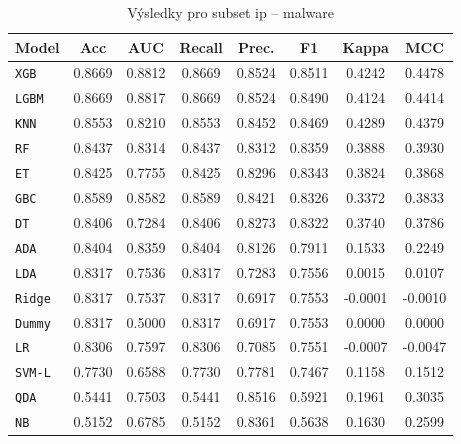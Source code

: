 \begin{table}[H]
  \centering
  \small
  \caption{Výsledky pro subset ip – malware}
  \begin{tabular}{|l|c|c|c|c|c|c|c|}
    \hline
    \textbf{Model} & \textbf{Acc} & \textbf{AUC} & \textbf{Recall} & \textbf{Prec.} & \textbf{F1} & \textbf{Kappa} & \textbf{MCC} \\
    \hline
    \texttt{XGB} & 0.8669 & 0.8812 & 0.8669 & 0.8524 & 0.8511 & 0.4242 & 0.4478 \\
    \texttt{LGBM} & 0.8669 & 0.8817 & 0.8669 & 0.8524 & 0.8490 & 0.4124 & 0.4414 \\
    \texttt{KNN} & 0.8553 & 0.8210 & 0.8553 & 0.8452 & 0.8469 & 0.4289 & 0.4379 \\
    \texttt{RF} & 0.8437 & 0.8314 & 0.8437 & 0.8312 & 0.8359 & 0.3888 & 0.3930 \\
    \texttt{ET} & 0.8425 & 0.7755 & 0.8425 & 0.8296 & 0.8343 & 0.3824 & 0.3868 \\
    \texttt{GBC} & 0.8589 & 0.8582 & 0.8589 & 0.8421 & 0.8326 & 0.3372 & 0.3833 \\
    \texttt{DT} & 0.8406 & 0.7284 & 0.8406 & 0.8273 & 0.8322 & 0.3740 & 0.3786 \\
    \texttt{ADA} & 0.8404 & 0.8359 & 0.8404 & 0.8126 & 0.7911 & 0.1533 & 0.2249 \\
    \texttt{LDA} & 0.8317 & 0.7536 & 0.8317 & 0.7283 & 0.7556 & 0.0015 & 0.0107 \\
    \texttt{Ridge} & 0.8317 & 0.7537 & 0.8317 & 0.6917 & 0.7553 & -0.0001 & -0.0010 \\
    \texttt{Dummy} & 0.8317 & 0.5000 & 0.8317 & 0.6917 & 0.7553 & 0.0000 & 0.0000 \\
    \texttt{LR} & 0.8306 & 0.7597 & 0.8306 & 0.7085 & 0.7551 & -0.0007 & -0.0047 \\
    \texttt{SVM-L} & 0.7730 & 0.6588 & 0.7730 & 0.7781 & 0.7467 & 0.1158 & 0.1512 \\
    \texttt{QDA} & 0.5441 & 0.7503 & 0.5441 & 0.8516 & 0.5921 & 0.1961 & 0.3035 \\
    \texttt{NB} & 0.5152 & 0.6785 & 0.5152 & 0.8361 & 0.5638 & 0.1630 & 0.2599 \\
    \hline
  \end{tabular}
\end{table}
\vspace{0.5cm}

